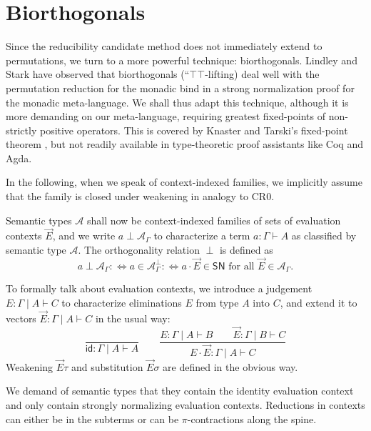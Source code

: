 \documentclass[a4paper,USenglish,cleveref, autoref, thm-restate]{lipics-v2019}
\newcommand{\defiff}{\mathrel{{{:}{\Longleftrightarrow}}}}
\newcommand{\tid}{\mathsf{id}}
\newcommand{\ru}{\dfrac}
\newcommand{\A}{\mathcal{A}}
\newcommand{\SN}{\mathsf{SN}}
\begin{document}
\section{Biorthogonals}
\label{sec:biortho}

Since the reducibility candidate method does not immediately extend to
permutations, we turn to a more powerful technique: biorthogonals.
Lindley and Stark \cite{lindleyStark:redComput} have observed that
biorthogonals (``$\top\top$-lifting) deal well with the permutation
reduction for the monadic bind in a strong normalization proof for the
monadic meta-language.  We shall thus adapt this technique, although
it is more demanding on our meta-language, requiring greatest
fixed-points of non-strictly positive operators.  This is covered by
Knaster and Tarski's fixed-point theorem \cite{tarski:fixpoint}, but
not readily available in type-theoretic proof assistants like Coq and
Agda.

In the following, when we speak of context-indexed families, we
implicitly assume that the family is closed under weakening in analogy
to CR0.

Semantic types $\A$ shall now be context-indexed families of sets of
evaluation contexts $\vec E$, and we write $a \perp \A_\Gamma$ to
characterize a term $a : \Gamma \vdash A$ as classified by semantic
type $\A$.  The orthogonality relation $\perp$ is defined as
\[
  a \perp \A_\Gamma \defiff
  a \in \A_\Gamma^\perp \defiff
  a \cdot \vec E \in \SN \mbox{ for all } \vec E \in \A_\Gamma
  .
\]

To formally talk about evaluation contexts, we introduce a judgement
$E : \Gamma \mid A \vdash C$ to characterize eliminations $E$ from type $A$
into $C$, and extend it to vectors $\vec E : \Gamma \mid A \vdash C$
in the usual way:
\[
  \ru{}{\tid : \Gamma \mid A \vdash A}
\qquad
  \ru{E : \Gamma \mid A \vdash B \qquad
      \vec E : \Gamma \mid B \vdash C
    }{E \cdot \vec E : \Gamma \mid A \vdash C}
\]
Weakening $\vec E \tau$ and substitution $\vec E \sigma$ are defined
in the obvious way.

We demand of semantic types that they contain the identity evaluation
context and only contain strongly normalizing evaluation contexts.
Reductions in contexts can either be in the subterms or can be
$\pi$-contractions along the spine.
\end{document}
